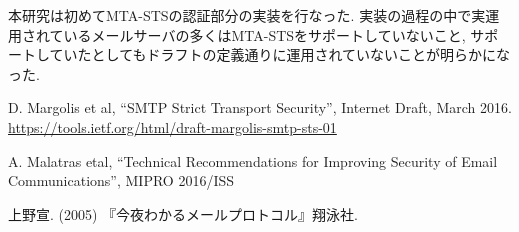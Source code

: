 \documentclass[a4j, 10pt, uplatex]{jsarticle}
\begin{document}
本研究は初めてMTA-STSの認証部分の実装を行なった. 実装の過程の中で実運用されているメールサーバの多くはMTA-STSをサポートしていないこと, サポートしていたとしてもドラフトの定義通りに運用されていないことが明らかになった.



\begin{thebibliography}{9}
D. Margolis et al,  “SMTP Strict Transport Security”,  Internet Draft,  March 2016.\\
\url{https://tools.ietf.org/html/draft-margolis-smtp-sts-01}

A. Malatras etal,  “Technical Recommendations for Improving Security of Email Communications”,  MIPRO 2016/ISS

上野宣. (2005) 『今夜わかるメールプロトコル』翔泳社.

\end{thebibliography}
\end{document}
